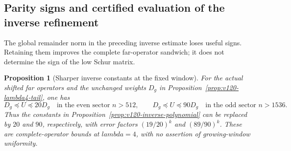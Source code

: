 \documentclass[11pt]{article}
\def\lambda{lambda}%
\newtheorem{proposition}[theorem]{Proposition}
\theoremstyle{remark}
\begin{document}
\subsection{Parity signs and certified evaluation of the inverse refinement}
The global remainder norm in the preceding inverse estimate loses useful
signs. Retaining them improves the complete far-operator sandwich;
it does not determine the sign of the low Schur matrix.

\begin{proposition}[Sharper inverse constants at the fixed window]
\label{prop:v122-parity-inverse}
For the actual shifted far operators and the unchanged weights $D_g$
in Proposition~\ref{prop:v120-lambda4-tail}, one has
\[
 D_g\preceq U\preceq20D_g\quad\text{in the even sector }n>512,
 \qquad
 D_g\preceq U\preceq90D_g\quad\text{in the odd sector }n>1536.
\]
Thus the constants in Proposition~\ref{prop:v120-inverse-polynomial}
can be replaced by $20$ and $90$, respectively, with error factors
$(19/20)^k$ and $(89/90)^k$. These are complete-operator bounds
at $\lambda=4$, with no assertion of growing-window uniformity.
\end{proposition}
\end{document}

